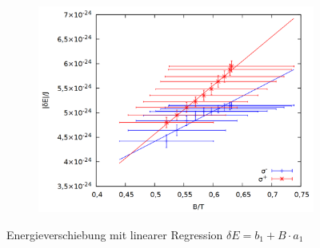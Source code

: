 \begin{figure}
\begin{subfigure}{0.6\textwidth}
\end{subfigure}
\begin{subfigure}{0.6\textwidth}
\includegraphics[width=\textwidth]{data/zeeman/out_zeeman_neu_rechts.png}
\end{subfigure}
\caption{Energieverschiebung mit linearer Regression $\delta E = b_1 + B \cdot a_1$}
\label{fig:res_lin}
\end{figure}

